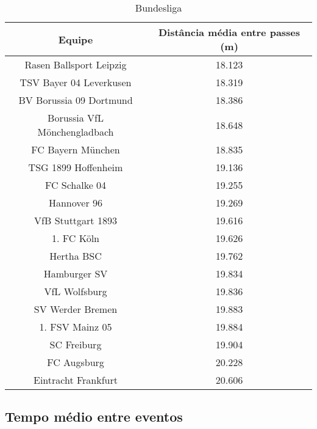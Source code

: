 \documentclass{article}
\begin{document}

\begin{table}[H]
    \centering
    \begin{tabular}{|c|c|}
        \hline
        \textbf{Equipe}              & \textbf{Distância média entre passes
        (m)}                                                                \\
        \hline
        Rasen Ballsport Leipzig      & 18.123
        \\ \hline
        TSV Bayer 04 Leverkusen      & 18.319
        \\ \hline
        BV Borussia 09 Dortmund      & 18.386
        \\ \hline
        Borussia VfL Mönchengladbach & 18.648
        \\ \hline
        FC Bayern München            & 18.835
        \\ \hline
        TSG 1899 Hoffenheim          & 19.136
        \\ \hline
        FC Schalke 04                & 19.255
        \\ \hline
        Hannover 96                  & 19.269
        \\ \hline
        VfB Stuttgart 1893           & 19.616
        \\ \hline
        1. FC Köln                   & 19.626
        \\ \hline
        Hertha BSC                   & 19.762
        \\ \hline
        Hamburger SV                 & 19.834
        \\ \hline
        VfL Wolfsburg                & 19.836
        \\ \hline
        SV Werder Bremen             & 19.883
        \\ \hline
        1. FSV Mainz 05              & 19.884
        \\ \hline
        SC Freiburg                  & 19.904
        \\ \hline
        FC Augsburg                  & 20.228
        \\ \hline
        Eintracht Frankfurt          & 20.606
        \\ \hline
    \end{tabular}
    \caption{Bundesliga}
    \label{tab:average_distance_germany}
\end{table}

\subsection{Tempo médio entre eventos}
\end{document}
